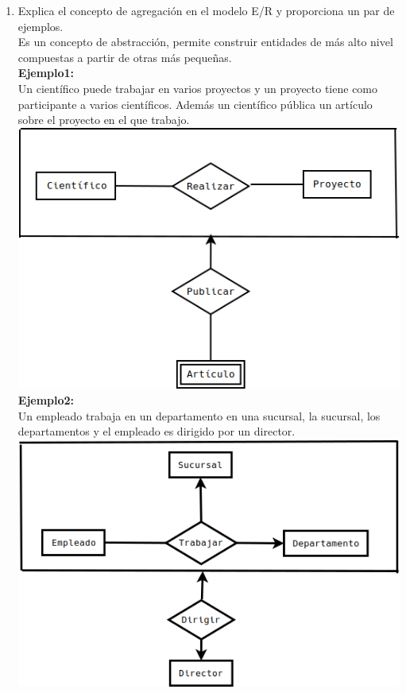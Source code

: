 \documentclass[a4paper, 12pt]{report}
\begin{document}
	\begin{enumerate}
		\item Explica el concepto de agregación en el modelo E/R y
		 proporciona un par de ejemplos.\\
		 
		 Es un concepto de abstracción, permite construir entidades
		 de más alto nivel compuestas a partir de otras más pequeñas.\\
		\textbf{Ejemplo1:}\\
		Un científico puede trabajar en varios proyectos y un proyecto
		tiene como participante a varios científicos. Además un 
		científico pública un artículo sobre el proyecto en el que 
		trabajo.\\
		\includegraphics[scale= 0.5]{Ejemplo1}\\
		\textbf{Ejemplo2:}\\
		Un empleado trabaja en un departamento en una sucursal, la 
		sucursal, los departamentos y el empleado es dirigido por un
		director.\\
		\includegraphics[scale= 0.5]{Ejemplo2}

\end{enumerate}
\end{document}
